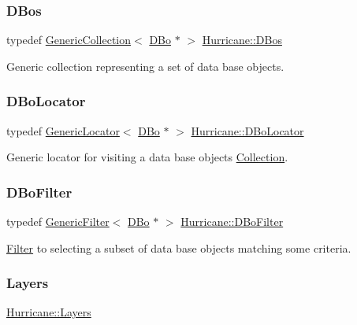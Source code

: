 \subsubsection{\texorpdfstring{D\+Bos}{DBos}}
{\footnotesize\ttfamily typedef \mbox{\hyperlink{classHurricane_1_1GenericCollection}{Generic\+Collection}}$<$ \mbox{\hyperlink{classHurricane_1_1DBo}{D\+Bo}} $\ast$ $>$ \mbox{\hyperlink{namespaceHurricane_a0aa3882e095f9d425c253223d1c0793d}{Hurricane\+::\+D\+Bos}}}

Generic collection representing a set of data base objects. \mbox{\label{namespaceHurricane_a7d70ef7ad837859e453171feb692535c}} 
\subsubsection{\texorpdfstring{D\+Bo\+Locator}{DBoLocator}}
{\footnotesize\ttfamily typedef \mbox{\hyperlink{classHurricane_1_1GenericLocator}{Generic\+Locator}}$<$ \mbox{\hyperlink{classHurricane_1_1DBo}{D\+Bo}} $\ast$ $>$ \mbox{\hyperlink{namespaceHurricane_a7d70ef7ad837859e453171feb692535c}{Hurricane\+::\+D\+Bo\+Locator}}}

Generic locator for visiting a data base objects \mbox{\hyperlink{classHurricane_1_1Collection}{Collection}}. \mbox{\label{namespaceHurricane_a2af87173f0c45c5dc1f504d3ea2317d9}} 
\subsubsection{\texorpdfstring{D\+Bo\+Filter}{DBoFilter}}
{\footnotesize\ttfamily typedef \mbox{\hyperlink{classHurricane_1_1GenericFilter}{Generic\+Filter}}$<$ \mbox{\hyperlink{classHurricane_1_1DBo}{D\+Bo}} $\ast$ $>$ \mbox{\hyperlink{namespaceHurricane_a2af87173f0c45c5dc1f504d3ea2317d9}{Hurricane\+::\+D\+Bo\+Filter}}}

\mbox{\hyperlink{classHurricane_1_1Filter}{Filter}} to selecting a subset of data base objects matching some criteria. \mbox{\label{namespaceHurricane_a7b7200a36ab7ce8a157ddbe78b625f38}} 
\subsubsection{\texorpdfstring{Layers}{Layers}}
{\footnotesize\ttfamily \mbox{\hyperlink{namespaceHurricane_a7b7200a36ab7ce8a157ddbe78b625f38}{Hurricane\+::\+Layers}}}

